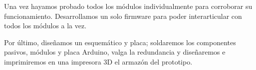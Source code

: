 \par \noindent
Una vez hayamos probado todos los módulos individualmente para corroborar su funcionamiento. Desarrollamos un solo firmware para poder interarticular con todos los módulos a la vez. 

\par \noindent
Por último, diseñamos un esquemático y placa; soldaremos los componentes pasivos, módulos y placa Arduino, valga la redundancia y diseñaremos e imprimiremos en una impresora 3D el armazón del prototipo.








